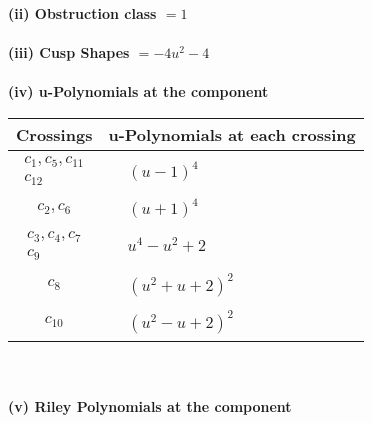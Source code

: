 \documentclass[1p]{elsarticle_modified}
\theoremstyle{definition}
\begin{document}
\flushleft \textbf{(ii) Obstruction class $= 1$}\\~\\
\flushleft \textbf{(iii) Cusp Shapes $= -4 u^2-4$}\\~\\
\newpage\renewcommand{\arraystretch}{1}
\flushleft \textbf{(iv) u-Polynomials at the component}\newline \\
\begin{tabular}{m{50pt}|m{274pt}}
Crossings & \hspace{64pt}u-Polynomials at each crossing \\
\hline $$\begin{aligned}c_{1},c_{5},c_{11}\\c_{12}\end{aligned}$$&$\begin{aligned}
&(u-1)^4
\end{aligned}$\\
\hline $$\begin{aligned}c_{2},c_{6}\end{aligned}$$&$\begin{aligned}
&(u+1)^4
\end{aligned}$\\
\hline $$\begin{aligned}c_{3},c_{4},c_{7}\\c_{9}\end{aligned}$$&$\begin{aligned}
&u^4- u^2+2
\end{aligned}$\\
\hline $$\begin{aligned}c_{8}\end{aligned}$$&$\begin{aligned}
&(u^2+u+2)^2
\end{aligned}$\\
\hline $$\begin{aligned}c_{10}\end{aligned}$$&$\begin{aligned}
&(u^2- u+2)^2
\end{aligned}$\\
\hline
\end{tabular}\\~\\
\newpage\renewcommand{\arraystretch}{1}
\flushleft \textbf{(v) Riley Polynomials at the component}\newline \\
\end{document}
